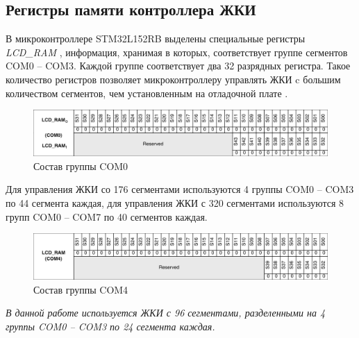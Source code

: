 \subsection{Регистры памяти контроллера ЖКИ}
\label{RegMemLCD}

В микроконтроллере STM32L152RB выделены специальные регистры \textit{LCD\_RAM} \cite{ReferManual}, информация, хранимая в которых, соответствует группе сегментов COM0 -- COM3. Каждой группе соответствует два 32 разрядных регистра. Такое количество регистров позволяет микроконтроллеру управлять ЖКИ c большим количеством сегментов, чем установленным на отладочной плате \cite{chip}.


\begin{figure}[h!]
\begin{center}
\includegraphics[scale=0.27]{Image/25.jpg}
\end{center}
\caption{Состав группы COM0}\label{COM0}
\end{figure}

Для управления ЖКИ со 176 сегментами используются 4 группы COM0 -- COM3 по 44 сегмента каждая, для управления ЖКИ с 320 сегментами используются 8 групп COM0 -- COM7 по 40 сегментов каждая.

\begin{figure}[h!]
\begin{center}
\includegraphics[scale=0.27]{Image/26.jpg}
\end{center}
\caption{Состав группы COM4}
\end{figure}

\begin{center}
\textit{В данной работе используется ЖКИ с 96 сегментами, разделенными на 4 группы COM0 -- COM3 по 24 сегмента каждая.}
\end{center}

